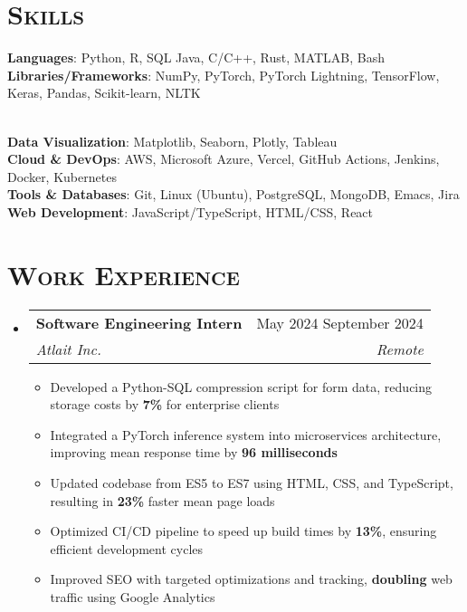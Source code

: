\documentclass[letterpaper, 11pt]{article}
\makeatletter
\newcommand{\resumeItem}[1]{
    \item \small {
        {#1 \vspace{-3pt}} %
    }
}
\newcommand{\resumeSubheading}[4]{ %
  \vspace{-2pt}\item
    \begin{tabular*}{0.99\textwidth}[t]{l@{\extracolsep{\fill}}r}
      \textbf{#1} & #2 \\
      \textit{\small#3} & \textit{\small #4} \\
    \end{tabular*}\vspace{-7pt}
}
\newcommand{\resumeSubHeadingListStart}{\begin{itemize}[leftmargin=0.15in, label={}]}
\newcommand{\resumeSubHeadingListEnd}{\end{itemize}}
\newcommand{\resumeItemListStart}{\begin{itemize}}
\newcommand{\resumeItemListEnd}{\end{itemize}\vspace{-10pt}}
\makeatother
\begin{document}
\section{\scshape Skills}
 \begin{itemize}[leftmargin=0.25in, label={}]
    \small{\item{
     \textbf{Languages}{: Python, R, SQL Java, C/C++, Rust, MATLAB, Bash} \\
     \textbf{Libraries/Frameworks}{: NumPy, PyTorch, PyTorch Lightning, TensorFlow, Keras, Pandas, Scikit-learn, NLTK}
    }} \\
    \textbf{Data Visualization}{: Matplotlib, Seaborn, Plotly, Tableau} \\
    \textbf{Cloud \& DevOps}{: AWS, Microsoft Azure, Vercel, GitHub Actions, Jenkins, Docker, Kubernetes} \\
     \textbf{Tools \& Databases}{: Git, Linux (Ubuntu), PostgreSQL, MongoDB,  Emacs, Jira} \\
     \textbf{Web Development}{: JavaScript/TypeScript, HTML/CSS, React} 
 \end{itemize}

\vspace{-23pt}

\section{\scshape Work Experience}
    \resumeSubHeadingListStart{}
        \resumeSubheading %
        {Software Engineering Intern}{May 2024 \textendash{} September 2024}
        {Atlait Inc.}{Remote}
        \resumeItemListStart{}
            \resumeItem{Developed a Python-SQL compression script for form data, reducing storage costs by \textbf{7\%} for enterprise clients}
            \resumeItem{Integrated a PyTorch inference system into microservices architecture, improving mean response time by \textbf{96 milliseconds}}
            \resumeItem{Updated codebase from ES5 to ES7 using HTML, CSS, and TypeScript, resulting in \textbf{23\%} faster mean page loads}
            \resumeItem{Optimized CI/CD pipeline to speed up build times by \textbf{13\%}, ensuring efficient development cycles}
            \resumeItem{Improved SEO with targeted optimizations and tracking, \textbf{doubling} web traffic using Google Analytics}
        \resumeItemListEnd{}
    \resumeSubHeadingListEnd{}

\vspace{-15pt}
\end{document}
